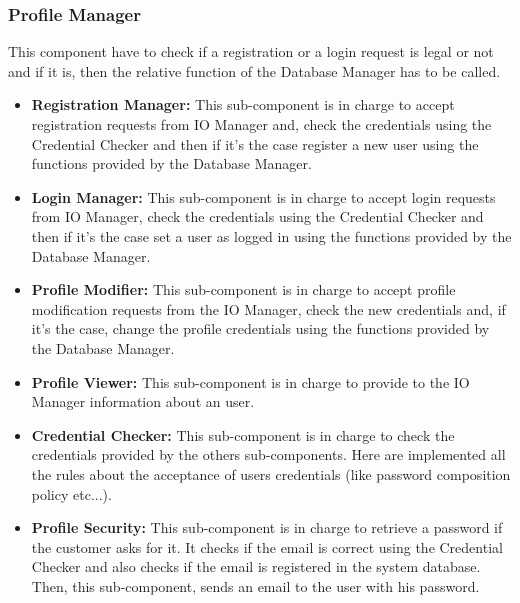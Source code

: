 \documentclass[../../../../../../../dd.tex]{subfiles}
\begin{document}
	\subsubsection{Profile Manager}
		This component have to check if a registration or a login request is legal or not and if it is, then the relative function of the Database Manager has to be called.
		\begin{itemize}
			\item \textbf{Registration Manager:} This sub-component is in charge to accept registration requests from IO Manager and, check the credentials using the Credential Checker and then if it's the case register a new user using the functions provided by the Database Manager.

			\item \textbf{Login Manager:} This sub-component is in charge to accept login requests from IO Manager, check the credentials using the Credential Checker and then if it's the case set a user as logged in using the functions provided by the Database Manager.

			\item \textbf{Profile Modifier:} This sub-component is in charge to accept profile modification requests from the IO Manager, check the new credentials and, if it's the case, change the profile credentials using the functions provided by the Database Manager.

			\item \textbf{Profile Viewer:} This sub-component is in charge to provide to the IO Manager information about an user.

			\item \textbf{Credential Checker:} This sub-component is in charge to check the credentials provided by the others sub-components. Here are implemented all the rules about the acceptance of users credentials (like password composition policy etc...).

			\item \textbf{Profile Security:} This sub-component is in charge to retrieve a password if the customer asks for it. It checks if the email is correct using the Credential Checker and also checks if the email is registered in the system database. Then, this sub-component, sends an email to the user with his password.
		
		\end{itemize}
\end{document}
